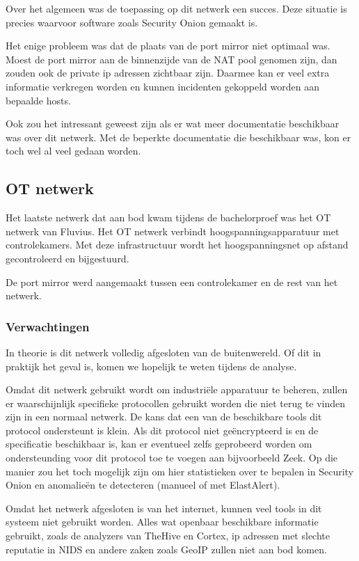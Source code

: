\documentclass[a4paper,12pt]{report}
\begin{document}
Over het algemeen was de toepassing op dit netwerk een succes.
Deze situatie is precies waarvoor software zoals Security Onion gemaakt is.

Het enige probleem was dat de plaats van de port mirror niet optimaal was.
Moest de port mirror aan de binnenzijde van de NAT pool genomen zijn, dan zouden ook de private ip adressen zichtbaar zijn.
Daarmee kan er veel extra informatie verkregen worden en kunnen incidenten gekoppeld worden aan bepaalde hosts.

Ook zou het intressant geweest zijn als er wat meer documentatie beschikbaar was over dit netwerk.
Met de beperkte documentatie die beschikbaar was, kon er toch wel al veel gedaan worden.

\subsection{OT netwerk}
\label{sec:ot-netwerk}
Het laatste netwerk dat aan bod kwam tijdens de bachelorproef was het OT netwerk van Fluvius.
Het OT netwerk verbindt hoogspanningsapparatuur met controlekamers.
Met deze infrastructuur wordt het hoogspanningsnet op afstand gecontroleerd en bijgestuurd.

De port mirror werd aangemaakt tussen een controlekamer en de rest van het netwerk.

\subsubsection{Verwachtingen}
In theorie is dit netwerk volledig afgesloten van de buitenwereld.
Of dit in praktijk het geval is, komen we hopelijk te weten tijdens de analyse.

Omdat dit netwerk gebruikt wordt om industriële apparatuur te beheren, zullen er waarschijnlijk specifieke protocollen gebruikt worden die niet terug te vinden zijn in een normaal netwerk.
De kans dat een van de beschikbare tools dit protocol ondersteunt is klein.
Als dit protocol niet geëncrypteerd is en de specificatie beschikbaar is, kan er eventueel zelfs geprobeerd worden om ondersteunding voor dit protocol toe te voegen aan bijvoorbeeld Zeek.
Op die manier zou het toch mogelijk zijn om hier statistieken over te bepalen in Security Onion en anomalieën te detecteren (manueel of met ElastAlert).

Omdat het netwerk afgesloten is van het internet, kunnen veel tools in dit systeem niet gebruikt worden.
Alles wat openbaar beschikbare informatie gebruikt, zoals de analyzers van TheHive en Cortex, ip adressen met slechte reputatie in NIDS en andere zaken zoals GeoIP zullen niet aan bod komen.
\end{document}
